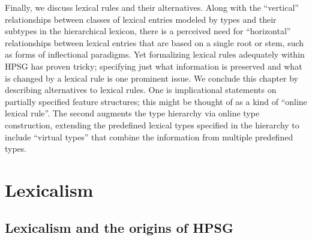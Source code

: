 \documentclass[output=paper]{langsci/langscibook}
\begin{document}
Finally, we discuss lexical rules and their alternatives.  Along with the ``vertical'' relationships between classes of lexical entries modeled by types and their subtypes in the hierarchical lexicon, there is a perceived need for ``horizontal'' relationships between lexical entries that are based on a single root or stem, such as forms of inflectional paradigms.  Yet formalizing lexical rules adequately within HPSG has proven tricky; specifying just what information is preserved and what is changed by a lexical rule is one prominent issue.  We conclude this chapter by describing alternatives to lexical rules.  One is implicational statements on partially specified feature structures; this might be thought of as a kind of ``online lexical rule''.  The second augments the type hierarchy via online type construction, extending the predefined lexical types specified in the hierarchy to include ``virtual types'' that combine the information from multiple predefined types.


\section{Lexicalism}
\label{sec:lex}
\subsection{Lexicalism and the origins of HPSG}
\end{document}
